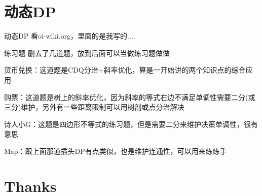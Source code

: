 \documentclass[9pt]{beamer}
\begin{document}
  \section{动态DP}

  \begin{frame}{动态DP}
     看oi-wiki.org，里面的是我写的....
  \end{frame}

  \begin{frame}{练习题}
     删去了几道题，放到后面可以当做练习题做做

    货币兑换：这道题是CDQ分治+斜率优化，算是一开始讲的两个知识点的综合应用

    购票：这道题是树上的斜率优化，因为斜率的等式右边不满足单调性需要二分(或三分)维护，另外有一些距离限制可以用树剖或点分治解决

    诗人小G：这题是四边形不等式的练习题，但是需要二分来维护决策单调性，很有意思

    Map：跟上面那道插头DP有点类似，也是维护连通性，可以用来练练手
  \end{frame}

  \section{Thanks}
\end{document}
